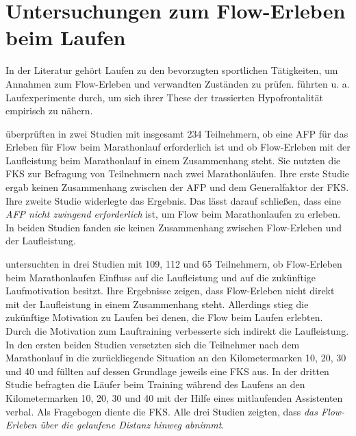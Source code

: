 

\section{Untersuchungen zum Flow-Erleben beim Laufen} 

\label{sec:untersuchungen_zum_flow_erleben_beim_laufen}

In der Literatur gehört Laufen zu den bevorzugten sportlichen Tätigkeiten, um Annahmen zum Flow-Erleben und verwandten Zuständen zu prüfen. \citet{Dietrich2004a} führten u. a. Laufexperimente durch, um sich ihrer These der trassierten Hypofrontalität empirisch zu nähern. 

\citet{Stoll2005} überprüften in zwei Studien mit insgesamt 234 Teilnehmern, ob eine \ac{AFP} für das Erleben für Flow beim Marathonlauf erforderlich ist und ob Flow-Erleben mit der Laufleistung beim Marathonlauf in einem Zusammenhang steht. Sie nutzten die \ac{FKS} zur Befragung von Teilnehmern nach zwei Marathonläufen. Ihre erste Studie ergab keinen Zusammenhang zwischen der \ac{AFP} und dem Generalfaktor der \ac{FKS}. Ihre zweite Studie widerlegte das Ergebnis. Das lässt \citet{Stoll2005} darauf schließen, dass eine \emph{\ac{AFP} nicht zwingend erforderlich} ist, um Flow beim Marathonlaufen zu erleben. In beiden Studien fanden sie keinen Zusammenhang zwischen Flow-Erleben und der Laufleistung. 

\citet{Schuler2009} untersuchten in drei Studien mit 109, 112 und 65 Teilnehmern, ob Flow-Erleben beim Marathonlaufen Einfluss auf die Laufleistung und auf die zukünftige Laufmotivation besitzt. Ihre Ergebnisse zeigen, dass Flow-Erleben nicht direkt mit der Laufleistung in einem Zusammenhang steht. Allerdings stieg die zukünftige Motivation zu Laufen bei denen, die Flow beim Laufen erlebten. Durch die Motivation zum Lauftraining verbesserte sich indirekt die Laufleistung. In den ersten beiden Studien versetzten sich die Teilnehmer nach dem Marathonlauf in die zurückliegende Situation an den Kilometermarken 10, 20, 30 und 40 und füllten auf dessen Grundlage jeweils eine \ac{FKS} aus. In der dritten Studie befragten \citet{Schuler2009} die Läufer beim Training während des Laufens an den Kilometermarken 10, 20, 30 und 40 mit der Hilfe eines mitlaufenden Assistenten verbal. Als Fragebogen diente die \ac{FKS}. Alle drei Studien zeigten, dass \emph{das Flow-Erleben über die gelaufene Distanz hinweg abnimmt}. 

